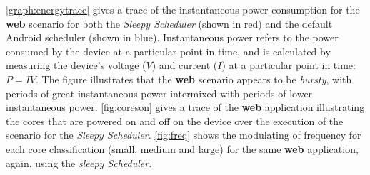 \documentclass[conference]{IEEEtran}
\begin{document}
\cref{graph:energytrace} gives a trace of the instantaneous power consumption for the \textbf{web} scenario for both the \emph{Sleepy Scheduler} (shown in red) and the default Android scheduler (shown in blue). Instantaneous power refers to the power consumed by the device at a particular point in time, and is calculated by measuring the device's voltage ($V$) and current ($I$) at a particular point in time: $P = IV$. The figure illustrates that the \textbf{web} scenario appears to be \emph{bursty}, with periods of great instantaneous power  intermixed with periods of lower instantaneous power. \cref{fig:coreson} gives a trace of the \textbf{web} application illustrating the cores that are powered on and off on the device over the execution of the scenario for the \emph{Sleepy Scheduler}. \cref{fig:freq} shows the modulating of frequency for each core classification (small, medium and large) for the same \textbf{web} application, again, using the \emph{sleepy Scheduler}.

 





  
\end{document}
